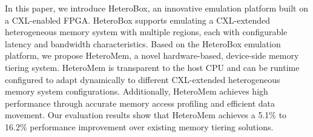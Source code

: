

In this paper, we introduce HeteroBox, an innovative emulation platform built on a CXL-enabled FPGA. HeteroBox supports emulating a CXL-extended heterogeneous memory system with multiple regions, each with configurable latency and bandwidth characteristics. Based on the HeteroBox emulation platform, we propose HeteroMem, a novel hardware-based, device-side memory tiering system. HeteroMem is transparent to the host CPU and can be runtime configured to adapt dynamically to different CXL-extended heterogeneous memory system configurations. Additionally, HeteroMem achieves high performance through accurate memory access profiling and efficient data movement.
Our evaluation results show that HeteroMem achieves a 5.1\% to 16.2\% performance improvement over existing memory tiering solutions.

